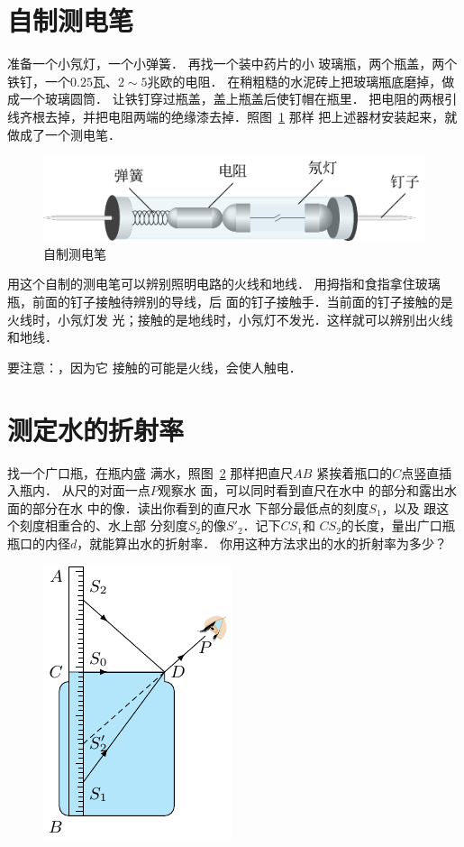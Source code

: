 \section{自制测电笔}
准备一个小氖灯，一个小弹簧．
再找一个装中药片的小
玻璃瓶，两个瓶盖，两个铁钉，一个$0.25$瓦、$2 \sim 5$兆欧的电阻．
在稍粗糙的水泥砖上把玻璃瓶底磨掉，做成一个玻璃圆筒．
让铁钉穿过瓶盖，盖上瓶盖后使钉帽在瓶里．
把电阻的两根引
线齐根去掉，并把电阻两端的绝缘漆去掉．照图~\ref{fig_C_10-13} 那样
把上述器材安装起来，就做成了一个测电笔．
\begin{figure}[htbp]
    \centering
    \includegraphics{fig/C/10-13.pdf}
    \caption{自制测电笔}\label{fig_C_10-13}
\end{figure}

用这个自制的测电笔可以辨别照明电路的火线和地线．
用拇指和食指拿住玻璃瓶，前面的钉子接触待辨别的导线，后
面的钉子接触手．当前面的钉子接触的是火线时，小氖灯发
光；接触的是地线时，小氖灯不发光．这样就可以辨别出火线
和地线．

要注意：，因为它
接触的可能是火线，会使人触电．

\section{测定水的折射率}
找一个广口瓶，在瓶内盛
满水，照图~\ref{fig_C_10-14} 那样把直尺$AB$
紧挨着瓶口的$C$点竖直插入瓶内．
从尺的对面一点$P$观察水
面，可以同时看到直尺在水中
的部分和露出水面的部分在水
中的像．读出你看到的直尺水
下部分最低点的刻度$S_1$，以及
跟这个刻度相重合的、水上部
分刻度$S_2$的像$S'_2$．记下$CS_1$和
$CS_2$的长度，量出广口瓶瓶口的内径$d$，就能算出水的折射率．
你用这种方法求出的水的折射率为多少？
\begin{figure}[htbp]
	\centering
	\includegraphics{fig/C/10-14.pdf}
	\caption{}\label{fig_C_10-14}
\end{figure} 

